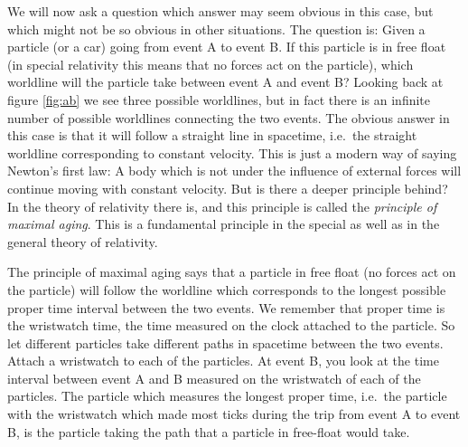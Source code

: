 {\begin{multicols}{2}
\pagebreak[2]

We will now ask a question which answer may seem obvious in this case, but which might not be so obvious in other situations. The question is: Given a particle (or a car) going from event A to event B. If this particle is in free float (in special relativity this means that no forces act on the particle), which worldline will the particle take between event A and event B? Looking back at figure \ref{fig:ab} we see three possible worldlines, but in fact there is an infinite number of possible worldlines connecting the two events. The obvious answer in this case is that it will follow a straight line in spacetime, i.e.\ the straight worldline corresponding to constant velocity. This is just a modern way of saying Newton's first law: A body which is not under the influence of external forces will continue moving with constant velocity. But is there a deeper principle behind? In the theory of relativity there is, and this principle is called the {\it principle of maximal aging\label{pg:maximalaging}}. This is a fundamental principle in the special as well as in the general theory of relativity.

The principle of maximal aging says that a particle in free float (no forces act on the particle) will follow the worldline which corresponds to the longest possible proper time interval between the two events. We remember that proper time is the wristwatch time\label{pg:wristwatchtime}, the time measured on the clock attached to the particle. So let different particles take different paths in spacetime between the two events. Attach a wristwatch to each of the particles. At event B, you look at the time interval between event A and B measured on the wristwatch of each of the particles. The particle which measures the longest proper time, i.e.\ the particle with the wristwatch which made most ticks during the trip from event A to event B, is the particle taking the path that a particle in free-float would take. 


\end{multicols}}

